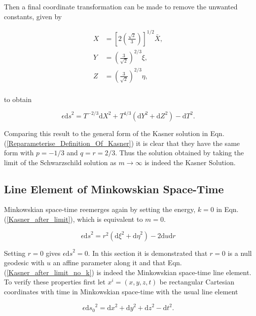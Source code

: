 \noindent Then a final coordinate transformation can be made to remove the unwanted constants, given by

\begin{align*} 
X & = \left[ 2\left( \frac{\sqrt{2}}{3}\right)\right]^{1/2} \bar{X}, \\
Y & = \left( \frac{3}{\sqrt{2}} \right)^{2/3} \xi, \\
Z & = \left( \frac{3}{\sqrt{2}} \right)^{2/3} \eta, \\
\end{align*} 

\noindent to obtain

\begin{equation}\label{Our_Kasner} 
\epsilon {\mathrm{d}s}^2 = T^{-2/3} {\mathrm{d}X}^2 + T^{4/3} \left( \mathrm{d}Y^2 + \mathrm{d}Z^2 \right) - \mathrm{d}T^2.
\end{equation}

\noindent Comparing this result to the general form of the Kasner solution in Eqn.(\ref{Reparameterise_Definition_Of_Kasner}) it is clear that they have the same form with $p=-1/3$ and $q=r=2/3$. Thus the solution obtained by taking the limit of the Schwarzschild solution as $m \rightarrow \infty$ is indeed the Kasner Solution. 

\subsection{Line Element of Minkowskian Space-Time}

Minkowskian space-time reemerges again by setting the energy, $k = 0$ in Eqn.(\ref{Kasner_after_limit}), which is equivalent to $m = 0$. 

\begin{equation}\label{Kasner_after_limit_no_k}
\epsilon {\mathrm{d}s}^2 = r^2 ({\mathrm{d}\xi}^2 + {\mathrm{d}\eta}^2) - 2 {\mathrm{d}u}{\mathrm{d}r}
\end{equation}

\noindent Setting $r = 0$ gives $\epsilon {\mathrm{d}s}^2 = 0$. In this section it is demonstrated that $r = 0$ is a null geodesic with $u$ an affine parameter along it and that Eqn.(\ref{Kasner_after_limit_no_k}) is indeed the Minkowskian space-time line element. To verify these properties first let $x^i = (x,y,z,t)$ be rectangular Cartesian coordinates with time in Minkowskian space-time with the usual line element

\begin{equation*} 
\epsilon {\mathrm{d}s_0}^2 = {\mathrm{d}x}^2 + {\mathrm{d}y}^2 + {\mathrm{d}z}^2 - {\mathrm{d}t}^2.
\end{equation*} 

